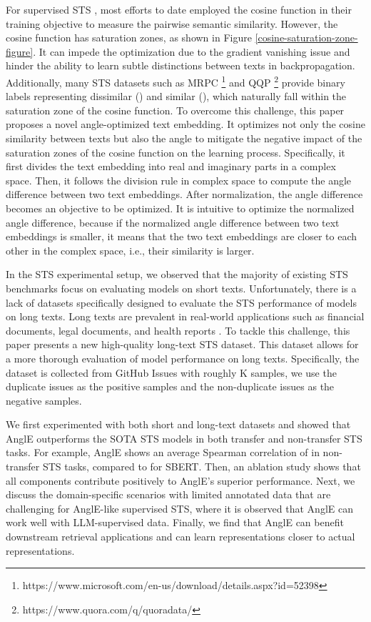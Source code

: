 \documentclass{article} \usepackage{iclr2024_conference,times}
\begin{document}
For supervised STS \citep{sbert-nils-2019,cosent_su_2022}, most efforts to date employed the cosine function in their training objective to measure the pairwise semantic similarity. 
However, the cosine function has saturation zones, as shown in Figure \ref{cosine-saturation-zone-figure}.
It can impede the optimization due to the gradient vanishing issue and hinder the ability to learn subtle distinctions between texts in backpropagation. 
Additionally, many STS datasets such as MRPC \footnote{https://www.microsoft.com/en-us/download/details.aspx?id=52398} and QQP \footnote{https://www.quora.com/q/quoradata/} provide binary labels representing dissimilar () and similar (), which naturally fall within the saturation zone of the cosine function. 
To overcome this challenge, this paper proposes a novel angle-optimized text embedding. It optimizes not only the cosine similarity between texts but also the angle to mitigate the negative impact of the saturation zones of the cosine function on the learning process. 
Specifically, it first divides the text embedding into real and imaginary parts in a complex space. 
Then, it follows the division rule in complex space to compute the angle difference between two text embeddings. 
After normalization, the angle difference becomes an objective to be optimized. 
It is intuitive to optimize the normalized angle difference, because if the normalized angle difference between two text embeddings is smaller, it means that the two text embeddings are closer to each other in the complex space, i.e., their similarity is larger.


In the STS experimental setup, we observed that the majority of existing STS benchmarks focus on evaluating models on short texts. Unfortunately, there is a lack of datasets specifically designed to evaluate the STS performance of models on long texts. Long texts are prevalent in real-world applications such as financial documents, legal documents, and health reports \citep{li-etal-2023-recurrent}. 
To tackle this challenge, this paper presents a new high-quality long-text STS dataset. This dataset allows for a more thorough evaluation of model performance on long texts. Specifically, the dataset is collected from GitHub Issues with roughly K samples, we use the duplicate issues as the positive samples and the non-duplicate issues as the negative samples.

We first experimented with both short and long-text datasets and showed that AnglE outperforms the SOTA STS models in both transfer and non-transfer STS tasks. 
For example, AnglE shows an average Spearman correlation of  in non-transfer STS tasks, compared to  for SBERT.
Then, an ablation study shows that all components contribute positively to AnglE's superior performance.
Next, we discuss the domain-specific scenarios with limited annotated data that are challenging for AnglE-like supervised STS, where it is observed that AnglE can work well with LLM-supervised data.
Finally, we find that AnglE can benefit downstream retrieval applications and can learn representations closer to actual representations.
\end{document}

